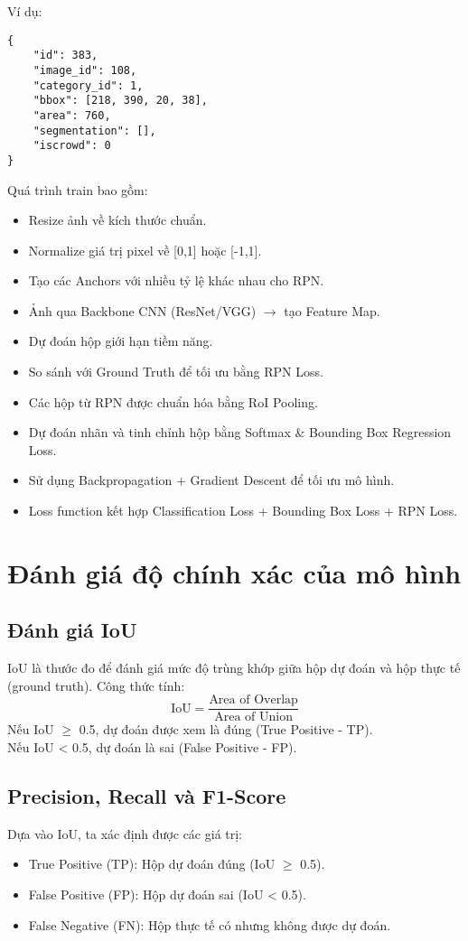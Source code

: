 \documentclass{article}
\begin{document}
Ví dụ:
\begin{verbatim}
{
    "id": 383,
    "image_id": 108,
    "category_id": 1,
    "bbox": [218, 390, 20, 38],
    "area": 760,
    "segmentation": [],
    "iscrowd": 0
}
\end{verbatim}

Quá trình train bao gồm:
\begin{itemize}
    \item Resize ảnh về kích thước chuẩn.
    \item Normalize giá trị pixel về [0,1] hoặc [-1,1].
    \item Tạo các Anchors với nhiều tỷ lệ khác nhau cho RPN.
    \item Ảnh qua Backbone CNN (ResNet/VGG) $\rightarrow$ tạo Feature Map.
    \item Dự đoán hộp giới hạn tiềm năng.
    \item So sánh với Ground Truth để tối ưu bằng RPN Loss.
    \item Các hộp từ RPN được chuẩn hóa bằng RoI Pooling.
    \item Dự đoán nhãn và tinh chỉnh hộp bằng Softmax \& Bounding Box Regression Loss.
    \item Sử dụng Backpropagation + Gradient Descent để tối ưu mô hình.
    \item Loss function kết hợp Classification Loss + Bounding Box Loss + RPN Loss.
\end{itemize}

\section{Đánh giá độ chính xác của mô hình}

\subsection{Đánh giá IoU}
IoU là thước đo để đánh giá mức độ trùng khớp giữa hộp dự đoán và hộp thực tế (ground truth). Công thức tính:
\[
\text{IoU} = \frac{\text{Area of Overlap}}{\text{Area of Union}}
\]
Nếu IoU $\geq$ 0.5, dự đoán được xem là đúng (True Positive - TP). \\
Nếu IoU < 0.5, dự đoán là sai (False Positive - FP).

\subsection{Precision, Recall và F1-Score}
Dựa vào IoU, ta xác định được các giá trị:
\begin{itemize}
    \item True Positive (TP): Hộp dự đoán đúng (IoU $\geq$ 0.5).
    \item False Positive (FP): Hộp dự đoán sai (IoU < 0.5).
    \item False Negative (FN): Hộp thực tế có nhưng không được dự đoán.
\end{itemize}
\end{document}
